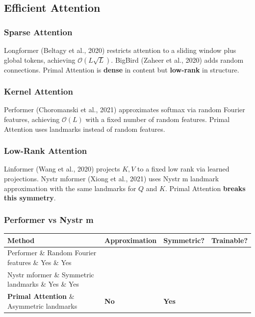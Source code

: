 \subsection{Efficient Attention}

\subsubsection{Sparse Attention}

Longformer (Beltagy et al., 2020) restricts attention to a sliding window 
plus global tokens, achieving $\mathcal{O}(L \sqrt{L})$. BigBird (Zaheer et 
al., 2020) adds random connections. Primal Attention is \textbf{dense} in content 
but \textbf{low-rank} in structure.

\subsubsection{Kernel Attention}

Performer (Choromanski et al., 2021) approximates softmax via random Fourier 
features, achieving $\mathcal{O}(L)$ with a fixed number of random features. 
Primal Attention uses landmarks instead of random features.

\subsubsection{Low-Rank Attention}

Linformer (Wang et al., 2020) projects $K, V$ to a fixed low rank via learned 
projections. Nystr mformer (Xiong et al., 2021) uses Nystr m landmark 
approximation with the same landmarks for $Q$ and $K$. Primal Attention 
\textbf{breaks this symmetry}.

\subsubsection{Performer vs Nystr m}

\begin{table}[H]
\centering
\small
\begin{tabular}{llll}
\toprule
\textbf{Method} & \textbf{Approximation} & \textbf{Symmetric?} & \textbf{Trainable?} \\
\midrule
Performer \& Random Fourier features \& Yes \& Yes \\
Nystr mformer \& Symmetric landmarks \& Yes \& Yes \\
\textbf{Primal Attention} \& Asymmetric landmarks & \textbf{No} & \textbf{Yes} \\
\bottomrule
\end{tabular}
\end{table}

